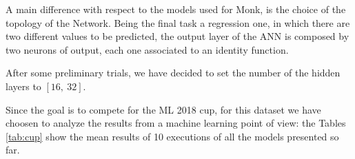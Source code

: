         \begin{table}[H]
            \centering
            \begin{subtable}{\textwidth}
            \end{subtable}
            \caption{Additional time-related statistics for the CUP dataset. The unit of time that has
            been used is the millisecond.}
            \label{tab:cup_time}
        \end{table}

        A main difference with respect to the models used for Monk, is the choice of the topology of the Network.
        Being the final task a regression one, in which there are two different values to be predicted, the output layer of the ANN is composed by two neurons of output, each one associated to an identity function.

        After some preliminary trials, we have decided to set the number of the hidden layers to $[16,\ 32]$.

        Since the goal is to compete for the ML 2018 cup, for this dataset we have choosen to analyze the results from a machine learning point of view: the Tables \ref{tab:cup} show the mean results of 10 executions of all the models presented so far.

